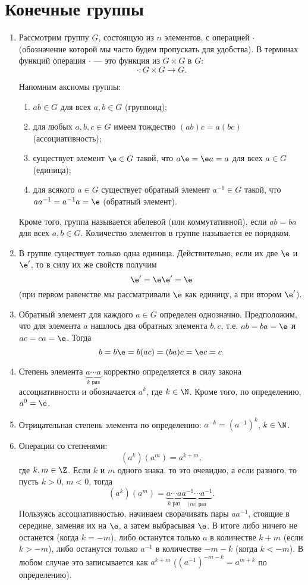 \section{Конечные группы}


\begin{enumerate}
\item Рассмотрим группу $G$, состоящую из $n$ элементов, с операцией $\cdot$ (обозначение которой мы часто будем пропускать для удобства). В терминах функций операция $\cdot$ --- это функция из $G\times G$ в $G$:
$$
\cdot: G\times G\to G.
$$

Напомним аксиомы группы:
\begin{enumerate}[G1]
\item $ab\in G$ для всех $a,b\in G$ (группоид);
\item для любых $a,b,c\in G$ имеем тождество $(ab)c=a(bc)$ (ассоциативность);
\item существует элемент $\e\in G$ такой, что $a\e=\e a=a$ для всех $a\in G$ (единица);
\item для всякого $a\in G$ существует обратный элемент $a^{-1}\in G$ такой, что $aa^{-1}=a^{-1}a=\e$ (обратный элемент).
\end{enumerate}
Кроме того, группа называется абелевой (или коммутативной), если $ab=ba$ для всех $a,b\in G$. Количество элементов в группе называется ее порядком.
\item В группе существует только одна единица. Действительно, если их две $\e$ и $\e'$, то в силу их же свойств получим
$$
\e' = \e\e' = \e
$$
(при первом равенстве мы рассматривали $\e$ как единицу, а при втором $\e'$).
\item Обратный элемент для каждого $a\in G$ определен однозначно. Предположим, что для элемента $a$ нашлось два обратных элемента $b,c$, т.е. $ab=ba=\e$ и $ac=ca=\e$. Тогда
$$
b=b\e=b(ac)=(ba)c=\e c=c.
$$
\item Степень элемента $\underbrace{a\cdots a}_{k\mbox{ раз}}$ корректно определяется в силу закона ассоциативности и обозначается $a^k$, где $k\in\N$. Кроме того, по определению, $a^0=\e$.
\item Отрицательная степень элемента по определению: $a^{-k}=(a^{-1})^k$, $k\in\N$.
\item Операции со степенями:
$$
(a^k)(a^m)=a^{k+m},
$$
где $k,m\in \Z$. Если $k$ и $m$ одного знака, то это очевидно, а если разного, то пусть $k>0$, $m<0$, тогда
$$
(a^k)(a^m) = \underbrace{a\cdots a}_{k\mbox{ раз}}\underbrace{a^{-1}\cdots a^{-1}}_{|m|\mbox{ раз}}.
$$
Пользуясь ассоциативностью, начинаем сворачивать пары $aa^{-1}$, стоящие в середине, заменяя их на $\e$, а затем выбрасывая $\e$. В итоге либо ничего не останется (когда $k=-m$), либо останутся только $a$ в количестве $k+m$ (если $k>-m$), либо останутся только $a^{-1}$ в количестве $-m-k$ (когда $k<-m$). В любом случае это записывается как $a^{k+m}$ ($(a^{-1})^{-m-k}=a^{m+k}$ по определению).


\end{enumerate}
